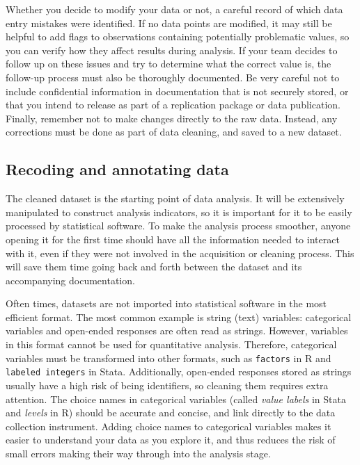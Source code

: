 Whether you decide to modify your data or not,
a careful record of which data entry mistakes were identified.
If no data points are modified, 
it may still be helpful to add flags to observations containing
potentially problematic values,
so you can verify how they affect results during analysis.
If your team decides to follow up on these issues and 
try to determine what the correct value is,
the follow-up process must also be thoroughly documented.
Be very careful not to include confidential information in documentation that is not securely stored,
or that you intend to release as part of a replication package or data publication.
Finally, remember not to make changes directly to the raw data.
Instead, any corrections must be done as part of data cleaning,
and saved to a new dataset.

\subsection{Recoding and annotating data}

The cleaned dataset is the starting point of data analysis.
It will be extensively manipulated to construct analysis indicators,
so it is important for it to be easily processed by statistical software.
To make the analysis process smoother, 
anyone opening it for the first time should have all the information needed to interact with it,
even if they were not involved in the acquisition or cleaning process.
This will save them time going back and forth between the dataset and its accompanying documentation. 

Often times, datasets are not imported into statistical software in the most efficient format.
The most common example is string (text) variables:
categorical variables and open-ended responses are often read as strings.
However, variables in this format cannot be used for quantitative analysis.
Therefore, categorical variables must be transformed into other formats,
such as \texttt{factors} in R and \texttt{labeled integers} in Stata.
Additionally, open-ended responses stored as strings usually have a high risk of being identifiers, 
so cleaning them requires extra attention.
The choice names in categorical variables
(called \textit{value labels} in Stata and \textit{levels} in R)
should be accurate and concise, 
and link directly to the data collection instrument.
Adding choice names to categorical variables 
makes it easier to understand your data as you explore it,
and thus reduces the risk of small errors making their way through into the analysis stage.

